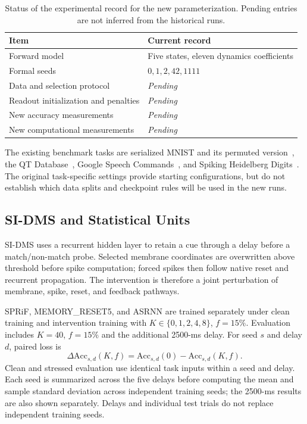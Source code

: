 \documentclass[letterpaper]{article}
\newcommand{\pending}{\textit{Pending}}
\begin{document}
\begin{table}[t]
\centering
\small
\begin{tabular}{@{}p{}p{}@{}}
\toprule
Item & Current record\\
\midrule
Forward model & Five states, eleven dynamics coefficients\\
Formal seeds & $0,1,2,42,1111$\\
Data and selection protocol & \pending\\
Readout initialization and penalties & \pending\\
New accuracy measurements & \pending\\
New computational measurements & \pending\\
\bottomrule
\end{tabular}
\caption{Status of the experimental record for the new parameterization. Pending entries are not inferred from the historical runs.}
\label{tab:supp_protocol_status}
\end{table}

The existing benchmark tasks are serialized MNIST and its permuted version~\cite{lecun1998gradient}, the QT Database~\cite{laguna1997database}, Google Speech Commands~\cite{warden2018speech}, and Spiking Heidelberg Digits~\cite{cramer2022heidelberg}. The original task-specific settings provide starting configurations, but do not establish which data splits and checkpoint rules will be used in the new runs.

\subsection{SI-DMS and Statistical Units}

SI-DMS uses a recurrent hidden layer to retain a cue through a delay before a match/non-match probe. Selected membrane coordinates are overwritten above threshold before spike computation; forced spikes then follow native reset and recurrent propagation. The intervention is therefore a joint perturbation of membrane, spike, reset, and feedback pathways.

SPRiF, MEMORY\_RESET5, and ASRNN are trained separately under clean training and intervention training with $K\in\{0,1,2,4,8\}$, $f=15\%$. Evaluation includes $K=40$, $f=15\%$ and the additional 2500-ms delay. For seed $s$ and delay $d$, paired loss is
\begin{equation}
\Delta\mathrm{Acc}_{s,d}(K,f)=\mathrm{Acc}_{s,d}(0)-\mathrm{Acc}_{s,d}(K,f).
\label{eq:supp_sidms_drop}
\end{equation}
Clean and stressed evaluation use identical task inputs within a seed and delay. Each seed is summarized across the five delays before computing the mean and sample standard deviation across independent training seeds; the 2500-ms results are also shown separately. Delays and individual test trials do not replace independent training seeds.
\end{document}
